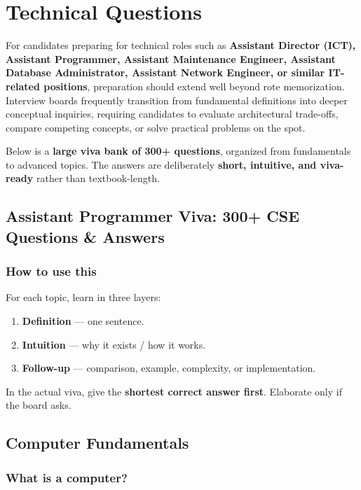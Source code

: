 \chapter{Technical Questions}
\label{ch:technical}


For candidates preparing for technical roles such as \textbf{Assistant Director (ICT), Assistant Programmer, Assistant Maintenance Engineer, Assistant Database Administrator, Assistant Network Engineer, or similar IT-related positions}, preparation should extend well beyond rote memorization. Interview boards frequently transition from fundamental definitions into deeper conceptual inquiries, requiring candidates to evaluate architectural trade-offs, compare competing concepts, or solve practical problems on the spot.

Below is a \textbf{large viva bank of 300+ questions}, organized from fundamentals to advanced topics. The answers are deliberately \textbf{short, intuitive, and viva-ready} rather than textbook-length.

\medskip

\section{Assistant Programmer Viva: 300+ CSE Questions \& Answers}

\subsection{How to use this}

For each topic, learn in three layers:

\begin{enumerate}
  \item \textbf{Definition} --- one sentence.
  \item \textbf{Intuition} --- why it exists / how it works.
  \item \textbf{Follow-up} --- comparison, example, complexity, or implementation.
\end{enumerate}

In the actual viva, give the \textbf{shortest correct answer first}. Elaborate only if the board asks.

\medskip

\section{Computer Fundamentals}

\subsection{What is a computer?}

